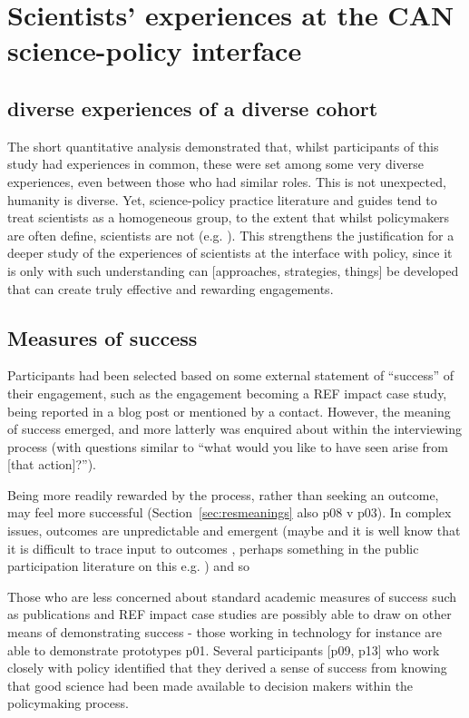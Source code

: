 \section{Scientists' experiences at the CAN science-policy interface}\label{sec:disexperience}

\subsection{diverse experiences of a diverse cohort}

The short quantitative analysis demonstrated that, whilst participants of this study had experiences in common, these were set among some very diverse experiences, even between those who had similar roles. This is not unexpected, humanity is diverse. Yet, science-policy practice literature and guides tend to treat scientists as a homogeneous group, to the extent that whilst policymakers are often define, scientists are not (e.g. \cite{BA2024trust}). This strengthens the justification for a deeper study of the experiences of scientists at the interface with policy, since it is only with such understanding can [approaches, strategies, things] be developed that can create truly effective and rewarding engagements.

\subsection{Measures of success}
Participants had been selected based on some external statement of ``success'' of their engagement, such as the engagement becoming a REF impact case study, being reported in a blog post or mentioned by a contact. However, the meaning of success emerged, and more latterly was enquired about within the interviewing process (with questions similar to ``what would you like to have seen arise from [that action]?'').

Being more readily rewarded by the process, rather than seeking an outcome, may feel more successful (Section~\ref{sec:resmeanings} also p08 v p03). In complex issues, outcomes are unpredictable and emergent (maybe \cite{SnowdenB2007} and it is well know that it is difficult to trace input to outcomes \cite{BednarekSHG2015}, perhaps something in the public participation literature on this e.g. \cite{Sprain2016}) and so 

Those who are less concerned about standard academic measures of success such as publications and REF impact case studies are possibly able to draw on other means of demonstrating success - those working in technology for instance are able to demonstrate prototypes p01. Several participants [p09, p13] who work closely with policy identified that they derived a sense of success from knowing that good science had been made available to decision makers within the policymaking process.

